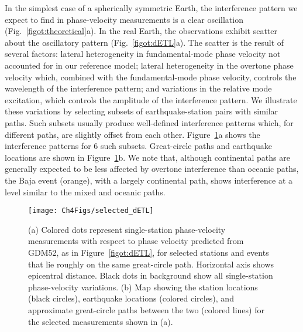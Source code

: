 \documentclass[12pt,oneside]{book}
\begin{document}
In the simplest case of a spherically symmetric Earth, the interference pattern we expect to find in phase-velocity measurements is a clear oscillation (Fig.~\ref{figot:theoretical}a). In the real Earth, the observations exhibit scatter about the oscillatory pattern (Fig.~\ref{figot:dETL}a). The scatter is the result of several factors: lateral heterogeneity in fundamental-mode phase velocity not accounted for in our reference model; lateral heterogeneity in the overtone phase velocity which, combined with the fundamental-mode phase velocity, controls the wavelength of the interference pattern; and variations in the relative mode excitation, which controls the amplitude of the interference pattern. We illustrate these variations by selecting subsets of earthquake-station pairs with similar paths. Such subsets usually produce well-defined interference patterns which, for different paths, are slightly offset from each other. Figure~\ref{figot:dETL_sel}a shows the interference patterns for 6 such subsets. Great-circle paths and earthquake locations are shown in Figure~\ref{figot:dETL_sel}b. We note that, although continental paths are generally expected to be less affected by overtone interference than oceanic paths, the Baja event (orange), with a largely continental path, shows interference at a level similar to the mixed and oceanic paths. 

\begin{figure} 
\begin{center}
\texttt{[image: Ch4Figs/selected\_dETL]} 
\caption[Selected earthquake subsets of overtone interference in single-station phase-velocity measurements]{(a) Colored dots represent single-station phase-velocity measurements with respect to phase velocity predicted from GDM52, as in Figure~\ref{figot:dETL}, for selected stations and events that lie roughly on the same great-circle path. Horizontal axis shows epicentral distance. Black dots in background show all single-station phase-velocity variations. (b) Map showing the station locations (black circles), earthquake locations (colored circles), and approximate great-circle paths between the two (colored lines) for the selected measurements shown in (a). }
\label{figot:dETL_sel}
\end{center}
\end{figure}
%
\end{document}
